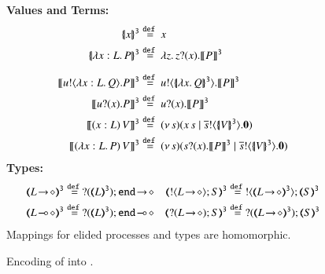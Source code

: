 
\begin{figure}[t]
	{\bf Values and Terms:}
	\begin{align*}
	\auxmap{x}{3} & \defeq  x
	\\
	\auxmap{\abs{x: L}{P}}{3} & \defeq  \abs{z}{\binp{z}{x} \pmap{P}{3}}
	\\[2mm]
	\pmap{\bout{u}{\abs{x: L}{Q}} P}{3} & \defeq \bout{u}{\auxmap{\abs{x}{Q}}{3} } \pmap{P}{3}
	\\
		\pmap{\binp{u}{x} P}{3} & \defeq \binp{u}{x} \pmap{P}{3}
	\\
		\pmap{\appl{(x:L)}{V}}{3} & \defeq \newsp{s}{\appl{x}{s} \Par \bout{\dual{s}}{\auxmap{V}{3}} \inact}
	\\
	\pmap{\appl{(\abs{x: L}{P})}{V}}{3} & \defeq \newsp{s}{\binp{s}{x} \pmap{P}{3} \Par  \bout{\dual{s}}{\auxmap{V}{3}} \inact}
	\end{align*}
{\bf Types:}
\begin{align*}
	 \tmap{\shot{L}}{3} & \defeq \shot{\btinp{\tmap{L}{3}} \tinact}
	&
	\tmap{\btout{\shot{L}} S}{3} & \defeq \btout{\tmap{\shot{L}}{3}} \tmap{S}{3}
	\\
	\tmap{\lhot{L}}{3} & \defeq \lhot{\btinp{\tmap{L}{3}} \tinact}
	&
	 \tmap{\btinp{\shot{L}} S}{3} & \defeq \btinp{\tmap{\shot{L}}{3}} \tmap{S}{3}
\end{align*}
Mappings for elided processes and types are homomorphic.
\caption{\label{f:enc:hopip_to_hopi} Encoding of \HOpp into \HOp.}
\end{figure} 
